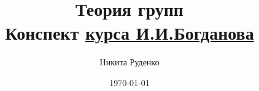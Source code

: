 


\author{Никита Руденко}
\title{%
  Теория групп \\
  \vspace{2ex}
  \large Конспект %
    \href{https://www.youtube.com/playlist?list=PLyBWNG-pZKx6pWlAfPRo2X_kPWyzq1ebj}%
    {курса И.\:И.\:Богданова}}
\date{\today}



\maketitle






